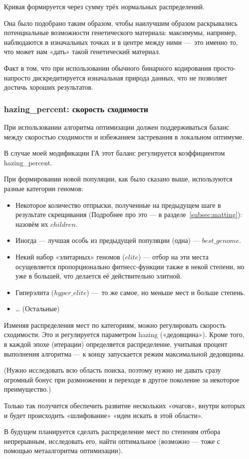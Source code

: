 Кривая формируется через сумму трёх нормальных распределений.

Она было подобрано таким образом, чтобы наилучшим образом раскрывались
потенциальные возможности генетического материала: максимумы, например, наблюдаются в изначальных точках
и в центре между ними — это именно то, что может нам «дать» такой генетический материал.

Факт в том, что при использовании обычного бинарного кодирования просто-напросто
дискредитируется изначальная природа данных, что не позволяет достичь хороших результатов.

\subsubsection{hazing\_percent: скорость сходимости}\label{subsubsec:hazing}

При использовании алгоритма оптимизации должен поддерживаться баланс
между скоростью сходимости и избежанием застревания в локальном оптимуме.

В случае моей модификации ГА этот баланс регулируется коэффициентом hazing\_percent.

При формировании новой популяции, как было сказано выше, используются разные категории геномов:

\begin{itemize}

    \item Некоторое количество отпрыски, полученные на предыдущем шаге в результате скрещивания (Подробнее про это — в разделе~\ref{subsec:matting}): назовём их $children$.
    \item Иногда — лучшая особь из предыдущей популяции (одна) — $best\_genome$.
    \item Некий набор «элитарных» геномов ($elite$) — отбор на эти места осущевляется пропорционально фитнесс-функции также в некой степени, но уже в большей,
            что делается её действительно элитной.

    \item Гиперэлита ($hyper\_elite$) — то же самое, но меньше мест и больше степень.

    \item … (Остальные)

\end{itemize}

Изменяя распределения мест по категориям, можно регулировать скорость сходимости.
Это и регулируется параметром hazing («дедовщина»).
Кроме того, в каждой эпохе (итерации) определяется распределение, учитывая процент выполнения алгоритма — к концу запускается режим максимальной дедовщины.

(Нужно исследовать всю область поиска,
поэтому нужно не давать сразу огромный бонус при размножении и переходе в другое поколение за некоторое преимущество.)

Только так получится обеспечить развитие нескольких «очагов», внутри которых и будет происходить «шлифование» «идеи искать в этой области».

В будущем планируется сделать распределение мест по степеням отбора непрерывным,
исследовать его, найти оптимальное (возможно — тоже с помощью метаалгоритма оптимизации).

